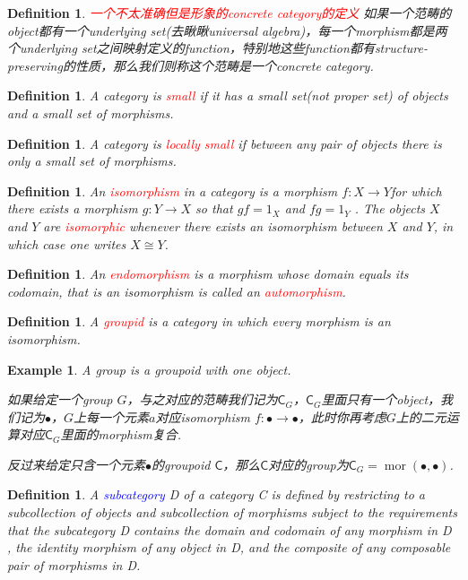 \documentclass{article}
\newtheorem{example}[theorem]{Example}
\newtheorem{definition}[theorem]{Definition}
\newcommand*{\cat}[1]{\textsf{#1}\xspace}
\newcommand{\id}{1}
\newcommand*{\xfunc}[4]{{#2}\colon{#3}{#1}{#4}}
\newcommand*{\func}[3]{\xfunc{\to}{#1}{#2}{#3}}
\DeclareMathOperator{\mor}{mor}
\newcommand{\redt}[1]{\textcolor{red}{#1}}
\newcommand{\bluet}[1]{\textcolor{blue}{#1}}
\begin{document}
\begin{definition}
\rm \redt{一个不太准确但是形象的concrete category的定义} 如果一个范畴的object都有一个underlying set(去瞅瞅universal algebra)，每一个morphism都是两个underlying set之间映射定义的function，特别地这些function都有structure-preserving的性质，那么我们则称这个范畴是一个concrete category. 
\end{definition}


\begin{definition}
\rm A category is \redt{small} if it has a small set(not proper set) of objects and a small set of morphisms.
\end{definition}


\begin{definition}
\rm A category is \redt{locally small} if between any pair of objects there is only a small set of morphisms. 
\end{definition}

\begin{definition}
\rm An \redt{isomorphism} in a category is a morphism $\func{f}{X}{Y}$for which there exists a morphism $\func{g}{Y}{X}$ so that $gf= \id_X$ and $fg = \id_Y$ . The objects $X$ and $Y$ are \redt{isomorphic} whenever there exists an isomorphism between $X$ and $Y$, in which case one writes $X \cong Y$. 
\end{definition}

\begin{definition}
\rm An \redt{endomorphism} is a morphism whose domain equals its codomain, that is an isomorphism is called an \redt{automorphism}. 
\end{definition}

\begin{definition}
\rm A \redt{groupid} is a category in which every morphism  is an isomorphism. 
\end{definition}

\begin{example}
\rm A group is a groupoid with one object. 

如果给定一个group $G$，与之对应的范畴我们记为$\cat{C}_G$，$\cat{C}_G$里面只有一个object，我们记为$\bullet$，$G$上每一个元素$a$对应isomorphism $\func{f}{\bullet}{\bullet}$，此时你再考虑$G$上的二元运算对应$\cat{C}_G$里面的morphism复合. 

反过来给定只含一个元素$\bullet$的groupoid $\cat{C}$，那么$\cat{C}$对应的group为$\cat{C}_G = \mor(\bullet,\bullet)$. 
\end{example}

\begin{definition}
\rm A \bluet{subcategory} D of a category C is defined by restricting to a subcollection of objects and subcollection of morphisms subject to the requirements that the subcategory D contains
the domain and codomain of any morphism in D , the identity morphism of any object in D, and the composite of any composable pair of morphisms in D.
\end{definition}
\end{document}
